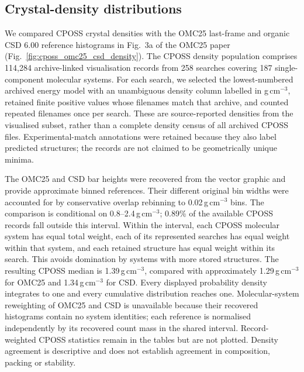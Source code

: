 \documentclass[11pt]{article}
\begin{document}
\subsection{Crystal-density distributions}
We compared CPOSS crystal densities with the OMC25 last-frame and organic CSD 6.00 reference histograms in Fig.~3a of the OMC25 paper\cite{gharakhanyan2026omc25} (Fig.~\ref{fig:cposs_omc25_csd_density}). The CPOSS density population comprises 114,284 archive-linked visualisation records from 258 searches covering 187 single-component molecular systems. For each search, we selected the lowest-numbered archived energy model with an unambiguous density column labelled in g\,cm$^{-3}$, retained finite positive values whose filenames match that archive, and counted repeated filenames once per search. These are source-reported densities from the visualised subset, rather than a complete density census of all archived CPOSS files. Experimental-match annotations were retained because they also label predicted structures; the records are not claimed to be geometrically unique minima.

The OMC25 and CSD bar heights were recovered from the vector graphic and provide approximate binned references. Their different original bin widths were accounted for by conservative overlap rebinning to 0.02\,g\,cm$^{-3}$ bins. The comparison is conditional on 0.8--2.4\,g\,cm$^{-3}$; 0.89\% of the available CPOSS records fall outside this interval. Within the interval, each CPOSS molecular system has equal total weight, each of its represented searches has equal weight within that system, and each retained structure has equal weight within its search. This avoids domination by systems with more stored structures. The resulting CPOSS median is 1.39\,g\,cm$^{-3}$, compared with approximately 1.29\,g\,cm$^{-3}$ for OMC25 and 1.34\,g\,cm$^{-3}$ for CSD. Every displayed probability density integrates to one and every cumulative distribution reaches one. Molecular-system reweighting of OMC25 and CSD is unavailable because their recovered histograms contain no system identities; each reference is normalised independently by its recovered count mass in the shared interval. Record-weighted CPOSS statistics remain in the tables but are not plotted. Density agreement is descriptive and does not establish agreement in composition, packing or stability.
\end{document}

